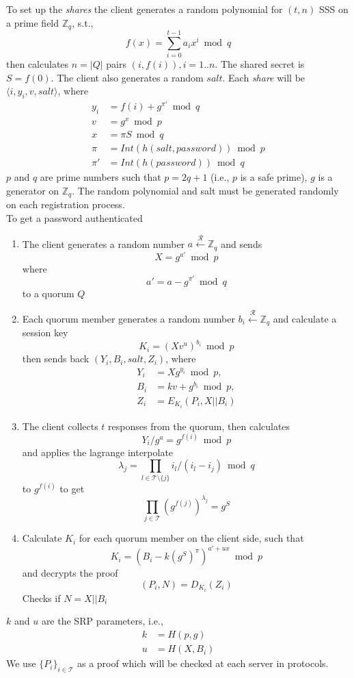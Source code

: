 \documentclass[twoside,twocolumn,10pt,fleqn]{article}
\begin{document}
To set up the {\em shares} the client generates a random polynomial
for $(t, n)$ SSS on a prime field $\mathbb{Z}_q$, s.t.,
\[
  f(x) = \sum_{i=0}^{t-1}a_ix^i \bmod q
\]
then calculates $n=|Q|$ pairs $(i,f(i)), i = 1..n$. The shared secret
is $S = f(0)$. The client also generates a random $salt$. Each {\em
share} will be $\langle i, y_i, v, salt \rangle$, where
\begin{align*}
  y_i &= f(i) + g^{\pi'} \bmod q \\
  v &= g^x \bmod p \\
  x &= \pi S \bmod q \\
  \pi &= Int(h(salt, password)) \bmod p \\
  \pi' &= Int(h(password)) \bmod q
\end{align*}
$p$ and $q$ are prime numbers such that $p = 2q + 1$ (i.e., $p$ is a
safe prime), $g$ is a generator on $\mathbb{Z}_q$. The random
polynomial and salt must be generated randomly on each registration
process.\\

To get a password authenticated
\begin{enumerate}
\item The client generates a random number
  $a \xleftarrow{\mathcal{R}} \mathbb{Z}_q$
  and sends
  \[
    X = g^{a'} \bmod p
  \]
  where
  \[
    a' = a - g^{\pi'} \bmod q
  \]
  to a quorum $Q$
\item Each quorum member generates a random number
  $b_i \xleftarrow{\mathcal{R}} \mathbb{Z}_q$
  and calculate a session key
  \[ K_i = (Xv^u)^{b_i} \bmod p \]
  then sends back $(Y_i, B_i, salt, Z_i)$,
  where
  \begin{align*}
    Y_i &= X g^{y_i} \bmod p, \\
    B_i &= kv + g^{b_i} \bmod p, \\
    Z_i &= E_{K_i}(P_i, X ||B_i)
  \end{align*}
\item The client collects $t$ responses from the quorum, then
  calculates
  \[
    Y_i/g^a = g^{f(i)} \bmod p
  \]
  and applies the lagrange interpolate
  \[
    \lambda_j = \prod_{l \in \mathcal{T} \setminus \{j\}}
    i_l / (i_l - i_j) \bmod q
  \]
  to $g^{f(i)}$ 
  to get
  \[
    \prod_{j \in \mathcal{T}}(g^{f(j)})^{\lambda_j} = g^S
  \]
\item Calculate $K_i$ for each quorum member on the client side, such
  that
  \[
    K_i = (B_i - k(g^S)^{\pi})^{a'+ux} \bmod p
  \]
  and decrypts the proof
  \[
    (P_i, N) = D_{K_i}(Z_i)
  \]
  Checks if $N = X||B_i$
\end{enumerate}
$k$ and $u$ are the SRP parameters, i.e.,
\begin{align*}
  k &= H(p, g) \\
  u &= H(X, B_i)
\end{align*}
We use $\{P_i\}_{i \in \mathcal{T}}$ as a proof which will be
checked at each server in protocols.
\end{document}
